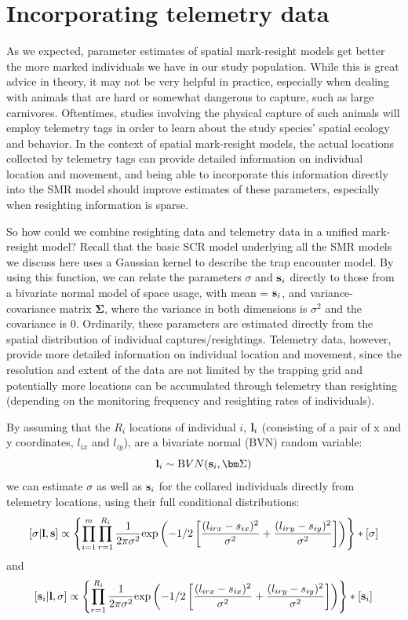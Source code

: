 \section{Incorporating telemetry data}
\label{partialID.sec.telemetry}

As we expected, parameter estimates of spatial mark-resight models get
better the more marked individuals we have in our study
population. While this is great advice in theory, it may not be very
helpful in practice, especially when dealing with animals that are
hard or somewhat dangerous to capture, such as large
carnivores. Oftentimes, studies involving the physical capture of such
animals will employ telemetry tags in order to learn about the study
species' spatial ecology and behavior. In the context of spatial
mark-resight models, the actual locations
collected by telemetry tags can provide detailed information on individual location and movement, and being able to incorporate this information directly into the SMR model should improve estimates of these parameters, especially when resighting information is sparse.


So how could we combine resighting data and telemetry data in a
unified mark-resight model? Recall that the basic SCR model underlying
all the SMR models we discuss here uses a Gaussian kernel to describe
the trap encounter model.  By using this function, we can relate the
parameters $\sigma$ and ${\bf s}_{i}$ directly to those from a
bivariate normal model of space usage, with mean = ${\bf s}_{i}$, and
variance-covariance matrix ${\bm \Sigma}$, where the variance in both
dimensions is $\sigma^2$ and the covariance is 0. Ordinarily, these
parameters are estimated directly from the spatial distribution of
individual captures/resightings. Telemetry data, however, provide more
detailed information on individual location and movement, since the
resolution and extent of the data are not limited by the trapping grid
and potentially more locations can be accumulated through telemetry
than resighting (depending on the monitoring frequency and resighting
rates of individuals).

By assuming that the $R_i$ locations of individual $i$, ${\bf l}_{i}$ (consisting of a pair of x and y coordinates, $l_{ix}$ and $l_{iy}$), are a bivariate normal (BVN) random variable:
\[
{\bf l}_i\sim {\mbox BVN} ({\bf s}_i,{\bm \Sigma})
\]
we can estimate $\sigma$ as well as ${\bf s}_{i}$ for the collared individuals directly from telemetry locations, using their full conditional distributions:
\[
[\sigma|{\bf l},{\bf s}] \propto \left\{\prod_{i=1}^m \prod_{r=1}^{R_{i}} \frac{1}{2 \pi \sigma^2} {\exp}\left(-1/2 \left[ \frac {(l_{irx}-s_{ix})^2} {\sigma^2} + \frac{(l_{iry}-s_{iy})^2}{\sigma^2} \right]\right)\right\}*[\sigma]
\]
and
\[
[{\bf s}_i|{\bf l},\sigma] \propto \left\{\prod_{r=1}^{R_{i}} \frac{1}{2 \pi \sigma^2} {\exp}\left(-1/2 \left[ \frac {(l_{irx}-s_{ix})^2} {\sigma^2} + \frac{(l_{iry}-s_{iy})^2}{\sigma^2} \right]\right)\right\}*[{\bf s}_{i}]
\]

